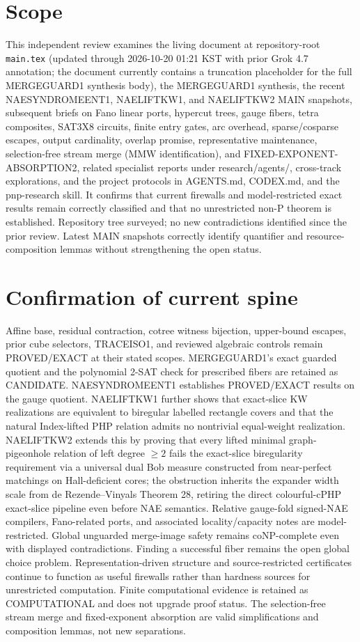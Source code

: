 \documentclass[11pt]{article}
\begin{document}
\section{Scope}
This independent review examines the living document at repository-root \texttt{main.tex} (updated through 2026-10-20 01:21 KST with prior Grok 4.7 annotation; the document currently contains a truncation placeholder for the full MERGEGUARD1 synthesis body), the MERGEGUARD1 synthesis, the recent NAESYNDROMEENT1, NAELIFTKW1, and NAELIFTKW2 MAIN snapshots, subsequent briefs on Fano linear ports, hypercut trees, gauge fibers, tetra composites, SAT3X8 circuits, finite entry gates, arc overhead, sparse/cosparse escapes, output cardinality, overlap promise, representative maintenance, selection-free stream merge (MMW identification), and FIXED-EXPONENT-ABSORPTION2, related specialist reports under research/agents/, cross-track explorations, and the project protocols in AGENTS.md, CODEX.md, and the pnp-research skill. It confirms that current firewalls and model-restricted exact results remain correctly classified and that no unrestricted non-P theorem is established. Repository tree surveyed; no new contradictions identified since the prior review. Latest MAIN snapshots correctly identify quantifier and resource-composition lemmas without strengthening the open status.

\section{Confirmation of current spine}
Affine base, residual contraction, cotree witness bijection, upper-bound escapes, prior cube selectors, TRACEISO1, and reviewed algebraic controls remain PROVED/EXACT at their stated scopes. MERGEGUARD1's exact guarded quotient and the polynomial 2-SAT check for prescribed fibers are retained as CANDIDATE. NAESYNDROMEENT1 establishes PROVED/EXACT results on the gauge quotient. NAELIFTKW1 further shows that exact-slice KW realizations are equivalent to biregular labelled rectangle covers and that the natural Index-lifted PHP relation admits no nontrivial equal-weight realization. NAELIFTKW2 extends this by proving that every lifted minimal graph-pigeonhole relation of left degree $\ge 2$ fails the exact-slice biregularity requirement via a universal dual Bob measure constructed from near-perfect matchings on Hall-deficient cores; the obstruction inherits the expander width scale from de Rezende--Vinyals Theorem 28, retiring the direct colourful-cPHP exact-slice pipeline even before NAE semantics. Relative gauge-fold signed-NAE compilers, Fano-related ports, and associated locality/capacity notes are model-restricted. Global unguarded merge-image safety remains coNP-complete even with displayed contradictions. Finding a successful fiber remains the open global choice problem. Representation-driven structure and source-restricted certificates continue to function as useful firewalls rather than hardness sources for unrestricted computation. Finite computational evidence is retained as COMPUTATIONAL and does not upgrade proof status. The selection-free stream merge and fixed-exponent absorption are valid simplifications and composition lemmas, not new separations.
\end{document}
